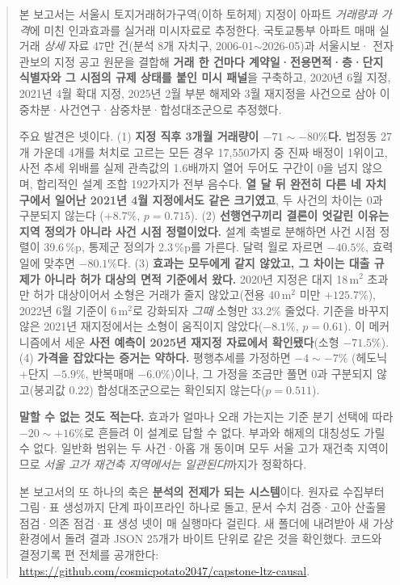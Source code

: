 
\begin{abstract}
본 보고서는 서울시 토지거래허가구역(이하 토허제) 지정이 아파트 \emph{거래량과
가격}에 미친 인과효과를 실거래 미시자료로 추정한다. 국토교통부 아파트 매매
실거래 \emph{상세} 자료 47만 건(분석 8개 자치구, 2006-01$\sim$2026-05)과 서울시보·
전자관보의 지정 공고 원문을 결합해 \textbf{거래 한 건마다 계약일·전용면적·층·단지
식별자와 그 시점의 규제 상태를 붙인 미시 패널}을 구축하고, 2020년 6월 지정,
2021년 4월 확대 지정, 2025년 2월 부분 해제와 3월 재지정을 사건으로 삼아
이중차분·사건연구·삼중차분·합성대조군으로 추정했다.

주요 발견은 넷이다.
(1) \textbf{지정 직후 3개월 거래량이 $-71 \sim -80\%$다.} 법정동 27개 가운데 4개를
처치로 고르는 모든 경우 17,550가지 중 진짜 배정이 1위이고, 사전 추세 위배를
실제 관측값의 1.6배까지 열어 두어도 구간이 0을 넘지 않으며, 합리적인 설계 조합
192가지가 전부 음수다. \textbf{열 달 뒤 완전히 다른 네 자치구에서 일어난
2021년 4월 지정에서도 같은 크기였고}, 두 사건의 차이는 0과 구분되지 않는다
($+8.7\%$, $p=0.715$).
(2) \textbf{선행연구끼리 결론이 엇갈린 이유는 지역 정의가 아니라 사건 시점
정렬이었다.} 설계 축별로 분해하면 사건 시점 정렬이 39.6\,\%p, 통제군 정의가
2.3\,\%p를 가른다. 달력 월로 자르면 $-40.5\%$, 효력일에 맞추면 $-80.1\%$다.
(3) \textbf{효과는 모두에게 같지 않았고, 그 차이는 대출 규제가 아니라 허가 대상의
면적 기준에서 왔다.} 2020년 지정은 대지 18\,m$^2$ 초과만 허가 대상이어서 소형은
거래가 줄지 않았고(전용 40\,m$^2$ 미만 $+125.7\%$), 2022년 6월 기준이 6\,m$^2$로
강화되자 \emph{그때} 소형만 33.2\% 줄었다. 기준을 바꾸지 않은 2021년 재지정에서는
소형이 움직이지 않았다($-8.1\%$, $p=0.61$). 이 메커니즘에서 세운
\textbf{사전 예측이 2025년 재지정 자료에서 확인됐다}(소형 $-71.5\%$).
(4) \textbf{가격을 잡았다는 증거는 약하다.} 평행추세를 가정하면 $-4 \sim -7\%$
(헤도닉+단지 $-5.9\%$, 반복매매 $-6.0\%$)이나, 그 가정을 조금만 풀면 0과
구분되지 않고(붕괴값 0.22) 합성대조군으로는 확인되지 않는다($p=0.511$).

\textbf{말할 수 없는 것도 적는다.} 효과가 얼마나 오래 가는지는 기준 분기 선택에
따라 $-20 \sim +16\%$로 흔들려 이 설계로 답할 수 없다. 부과와 해제의 대칭성도
가릴 수 없다. 일반화 범위는 두 사건·아홉 개 동이며 모두 서울 고가 재건축
지역이므로 \emph{서울 고가 재건축 지역에서는 일관된다}까지가 정확하다.

본 보고서의 또 하나의 축은 \textbf{분석의 전제가 되는 시스템}이다. 원자료 수집부터
그림·표 생성까지 \pipeSteps 단계 파이프라인 하나로 돌고, 문서 수치 검증·고아
산출물 점검·의존 점검·표 생성 넷이 매 실행마다 걸린다. 새 폴더에 내려받아 새 가상환경에서
돌려 결과 JSON 25개가 바이트 단위로 같은 것을 확인했다. 코드와 결정기록 \pipeDecisions 편
전체를 공개한다: \url{https://github.com/cosmicpotato2047/capstone-ltz-causal}.
\end{abstract}

